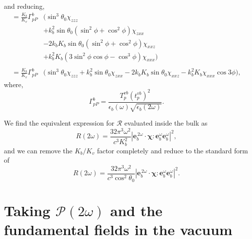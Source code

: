 and reducing,
\begin{equation*}
\begin{split}
=
\frac{K_{b}}{K_{v}}
\Gamma^{b}_{pP}
&\big(
   \sin^{3}\theta_{0}\chi_{zzz}\\
&+ k^{2}_{b}\sin\theta_{0}(\sin^{2}\phi + \cos^{2}\phi)\chi_{zxx}\\
&- 2k_{b}K_{b}\sin\theta_{0}(\sin^{2}\phi + \cos^{2}\phi)\chi_{xxz}\\
&+ k^{2}_{b}K_{b}(3\sin^{2}\phi\cos\phi - \cos^{3}\phi)\chi_{xxx}
\big)\\\\
=
\frac{K_{b}}{K_{v}}
\Gamma^{b}_{pP}
&\big(
  \sin^{3}\theta_{0}\chi_{zzz} 
+ k^{2}_{b}\sin\theta_{0}\chi_{zxx}
- 2k_{b}K_{b}\sin\theta_{0}\chi_{xxz}
- k^{2}_{b}K_{b}\chi_{xxx}\cos3\phi
\big),
\end{split}
\end{equation*}
where,
\begin{equation*}
\Gamma^{b}_{pP} =
\frac{T_{p}^{vb}\left(t^{vb}_{p}\right)^{2}}
     {\epsilon_{b}(\omega)\sqrt{\epsilon_{b}(2\omega)}}.
\end{equation*}

We find the equivalent expression for $\mathcal{R}$ evaluated inside the bulk
as
\begin{equation*}
R(2\omega) =
\frac{32\pi^{3} \omega^{2}}{c^{3}K^{2}_{b}}
\left\vert
\mathbf{e}^{\,2\omega}_{b}\cdot\boldsymbol{\chi}:
\mathbf{e}^{\omega}_{b}\mathbf{e}^{\omega}_{b}
\right\vert^{2} 
,
\end{equation*}
and we can remove the $K_{b}/K_{v}$ factor completely and reduce to the
standard form of
\begin{equation*}
R(2\omega) =
\frac{32\pi^{3} \omega^{2}}{c^{3}\cos^{2}\theta_{0}}
\left\vert
\mathbf{e}^{\,2\omega}_{b}\cdot\boldsymbol{\chi}:
\mathbf{e}^{\omega}_{b}\mathbf{e}^{\omega}_{b}
\right\vert^{2}.
\end{equation*}


\section{Taking \texorpdfstring{$\mathcal{P}(2\omega)$}{P(2w)} and the
fundamental fields in the vacuum}

